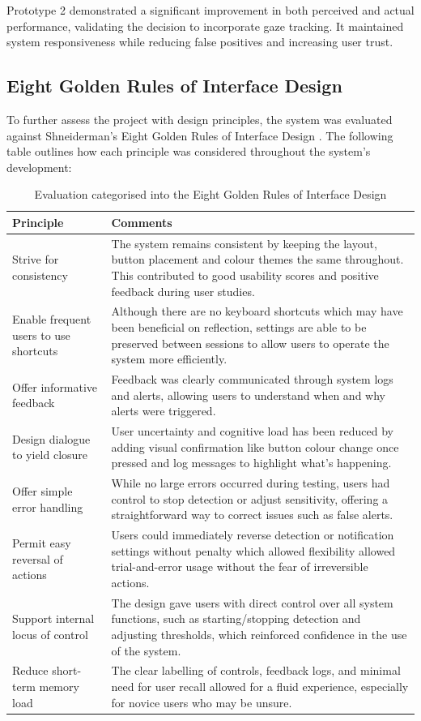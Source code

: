 \documentclass[12pt]{article}
\theoremstyle{plain}
\theoremstyle{definition}
\begin{document}
Prototype 2 demonstrated a significant improvement in both perceived and actual performance, validating the decision to incorporate gaze tracking. It maintained system responsiveness while reducing false positives and increasing user trust.

\subsection{Eight Golden Rules of Interface Design}

To further assess the project with design principles, the system was evaluated against Shneiderman’s Eight Golden Rules of Interface Design \cite{}. The following table outlines how each principle was considered throughout the system’s development:

\begin{table}[h!]
\centering
\begin{tabularx}{\textwidth}{|l|X|}
\hline
\textbf{Principle} & \textbf{Comments} \\
\hline
Strive for consistency & The system remains consistent by keeping the layout, button placement and colour themes the same throughout. This contributed to good usability scores and positive feedback during user studies. \\
\hline
Enable frequent users to use shortcuts & Although there are no keyboard shortcuts which may have been beneficial on reflection, settings are able to be preserved between sessions to allow users to operate the system more efficiently. \\
\hline
Offer informative feedback & Feedback was clearly communicated through system logs and alerts, allowing users to understand when and why alerts were triggered. \\
\hline
Design dialogue to yield closure & User uncertainty and cognitive load has been reduced by adding visual confirmation like button colour change once pressed and log messages to highlight what’s happening. \\
\hline
Offer simple error handling & While no large errors occurred during testing, users had control to stop detection or adjust sensitivity, offering a straightforward way to correct issues such as false alerts. \\
\hline
Permit easy reversal of actions & Users could immediately reverse detection or notification settings without penalty which allowed flexibility allowed trial-and-error usage without the fear of irreversible actions. \\
\hline
Support internal locus of control & The design gave users with direct control over all system functions, such as starting/stopping detection and adjusting thresholds, which reinforced confidence in the use of the system. \\
\hline
Reduce short-term memory load & The clear labelling of controls, feedback logs, and minimal need for user recall allowed for a fluid experience, especially for novice users who may be unsure. \\
\hline
\end{tabularx}
\caption{Evaluation categorised into the Eight Golden Rules of Interface Design \cite{} }
\end{table}
\end{document}
